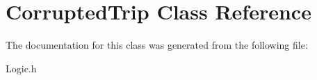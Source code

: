 \hypertarget{class_corrupted_trip}{\section{Corrupted\+Trip Class Reference}
\label{class_corrupted_trip}
}


The documentation for this class was generated from the following file\+:\begin{DoxyCompactItemize}
\item 
Logic.\+h\end{DoxyCompactItemize}
